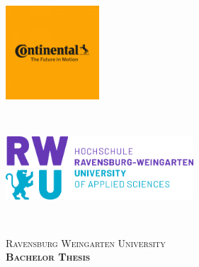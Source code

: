 \documentclass[a4paper,12pt,singlespacing]{article}
\begin{document}

\setlength{\parindent}{0ex}

\begin{titlepage}
	
	
	\begin{minipage}{0.4\textwidth}
		\begin{flushleft} \large
			\includegraphics[width=3.5cm]{./Images/conti_logo.png}
		\end{flushleft}
	\end{minipage}
	~
	\begin{minipage}{0.5\textwidth}
		\begin{flushright} \large
			\includegraphics[width=7cm]{./Images/logo.png}
		\end{flushright}
	\end{minipage}\\[1.5cm]
	
	
	\newcommand{\HRule}{\rule{\linewidth}{0.5mm}} %
	
	\center %
	
	
	\textsc{\LARGE Ravensburg Weingarten University}\\[1cm] %
	\textsc{\large  \textbf{Bachelor Thesis}}\\[0.5cm] %
	

\end{titlepage}
\end{document}

